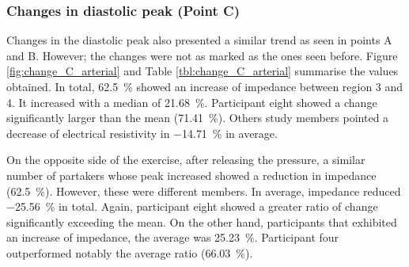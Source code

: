 \subsubsection{Changes in diastolic peak (Point C)}
\label{section5.3.2.3}
Changes in the diastolic peak also presented a similar trend as seen in points A and B. However; the changes were not as marked as the ones seen before. Figure \ref{fig:change_C_arterial} and Table \ref{tbl:change_C_arterial} summarise the values obtained. In total, \SI{62.5}{\percent} showed an increase of impedance between region 3 and 4. It increased with a median of \SI{21.68}{\percent}. Participant eight showed a change significantly larger than the mean (\SI{71.41}{\percent}). Others study members pointed a decrease of electrical resistivity in \SI{-14.71}{\percent} in average.  

On the opposite side of the exercise, after releasing the pressure, a similar number of partakers whose peak increased showed a reduction in impedance (\SI{62.5}{\percent}).  However, these were different members. In average, impedance reduced \SI{-25.56}{\percent} in total. Again, participant eight showed a greater ratio of change significantly exceeding the mean. On the other hand, participants that exhibited an increase of impedance, the average was \SI{25.23}{\percent}. Participant four outperformed notably the average ratio (\SI{66.03}{\percent}).

